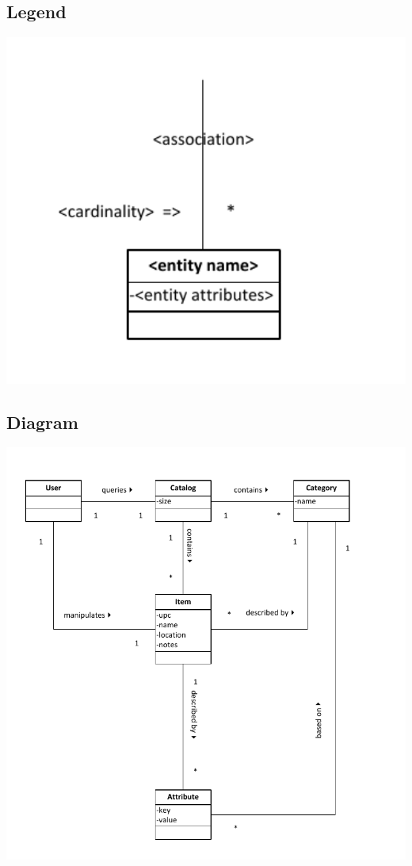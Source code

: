 \documentclass{article}
\begin{document}
\subsection{Legend}
\includegraphics[keepaspectratio, width=6in]{domain_model_legend.pdf}\\
\subsection{Diagram}
\includegraphics[keepaspectratio, width=6in]{domain_model.pdf}\\
\end{document}
